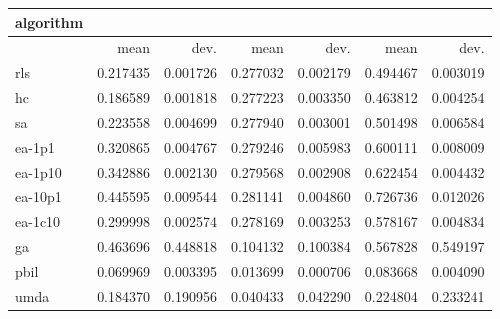 \begin{tabular}{@{}l*{6}{>{{}}N{1}{2}}@{}}
\toprule
{algorithm} &  &  &  \\
\midrule
& {mean} & {dev.} & {mean} & {dev.} & {mean} & {dev.} \\
\midrule
rls & 0.217435 & 0.001726 & 0.277032 & 0.002179 & 0.494467 & 0.003019 \\
 hc & 0.186589 & 0.001818 & 0.277223 & 0.003350 & 0.463812 & 0.004254 \\
 sa & 0.223558 & 0.004699 & 0.277940 & 0.003001 & 0.501498 & 0.006584 \\
 ea-1p1 & 0.320865 & 0.004767 & 0.279246 & 0.005983 & 0.600111 & 0.008009 \\
 ea-1p10 & 0.342886 & 0.002130 & 0.279568 & 0.002908 & 0.622454 & 0.004432 \\
 ea-10p1 & 0.445595 & 0.009544 & 0.281141 & 0.004860 & 0.726736 & 0.012026 \\
 ea-1c10 & 0.299998 & 0.002574 & 0.278169 & 0.003253 & 0.578167 & 0.004834 \\
 ga & 0.463696 & 0.448818 & 0.104132 & 0.100384 & 0.567828 & 0.549197 \\
 pbil & 0.069969 & 0.003395 & 0.013699 & 0.000706 & 0.083668 & 0.004090 \\
 umda & 0.184370 & 0.190956 & 0.040433 & 0.042290 & 0.224804 & 0.233241 \\
 \bottomrule
\end{tabular}
